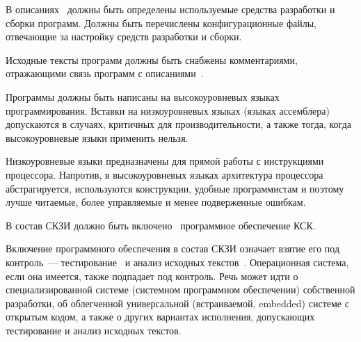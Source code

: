 \label{R.DI.Tools} %
В описаниях~ должны быть определены используемые средства
разработки и сборки программ. Должны быть перечислены конфигурационные файлы,
отвечающие за настройку средств разработки и сборки.

\label{R.DI.Comments} %
Исходные тексты программ должны быть снабжены комментариями,
отражающими связь программ с описаниями~.

\label{R.DI.Language} %
Программы должны быть написаны на высокоуровневых языках программирования.
Вставки на низкоуровневых языках (языках ассемблера) допускаются в случаях,
критичных для производительности, а также тогда, когда высокоуровневые языки
применить нельзя.

\begin{note*}
Низкоуровневые языки предназначены для прямой работы с инструкциями 
процессора. Напротив, в высокоуровневых языках архитектура процессора 
абстрагируется, используются конструкции, удобные программистам и поэтому  
лучше читаемые, более управляемые и менее подверженные ошибкам.
\end{note*}

\label{R.DI.OS} %
В состав СКЗИ должно быть включено~ программное 
обеспечение КСК.

\begin{note*}
Включение программного обеспечения в состав СКЗИ означает 
взятие его под контроль~--- тестирование~
и анализ исходных текстов~. 
%
Операционная система, если она имеется, также подпадает под контроль. 
%
Речь может идти о специализированной системе (системном программном обеспечении) 
собственной разработки, об облегченной универсальной (встраиваемой, 
embedded) системе с открытым кодом, а также о других вариантах исполнения,
допускающих тестирование и анализ исходных текстов.
\end{note*}

